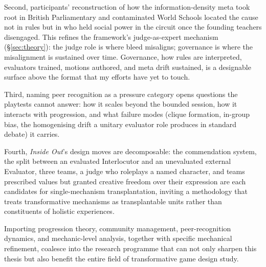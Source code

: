 Second, participants' reconstruction of how the information-density meta took root in British Parliamentary and contaminated World Schools located the cause not in rules but in who held social power in the circuit once the founding teachers disengaged. This refines the framework's judge-as-expert mechanism (§\ref{sec:theory}): the judge role is where bleed misaligns; governance is where the misalignment is sustained over time. Governance, how rules are interpreted, evaluators trained, motions authored, and meta drift sustained, is a designable surface above the format that my efforts have yet to touch. 

Third, naming peer recognition as a pressure category opens questions the playtests cannot answer: how it scales beyond the bounded session, how it interacts with progression, and what failure modes (clique formation, in-group bias, the homogenising drift a unitary evaluator role produces in standard debate) it carries.

Fourth, \emph{Inside Out}'s design moves are decomposable: the commendation system, the split between an evaluated Interlocutor and an unevaluated external Evaluator, three teams, a judge who roleplays a named character, and teams prescribed values but granted creative freedom over their expression are each candidates for single-mechanism transplantation, inviting a methodology that treats transformative mechanisms as transplantable units rather than constituents of holistic experiences.

Importing progression theory, community management, peer-recognition dynamics, and mechanic-level analysis, together with specific mechanical refinement, coalesce into the research programme that can not only sharpen this thesis but also benefit the entire field of transformative game design study.
